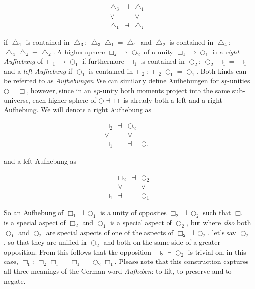 \documentclass{article}
\begin{document}
$$
  \begin{array}{ccc}
    \bigtriangleup_3 & \dashv & \bigtriangleup_4
    \\
    \vee & & \vee
    \\
    \bigtriangleup_1 & \dashv & \bigtriangleup_2
    \end{array}
  \ 
$$

if $\bigtriangleup_1$ is contained in $\bigtriangleup_3$: $\bigtriangleup_3\bigtriangleup_1=\bigtriangleup_1$
and $\bigtriangleup_2$ is contained in $\bigtriangleup_4$: $\bigtriangleup_4\bigtriangleup_2=\bigtriangleup_2$.
A higher sphere $\Box_2\rightarrow\bigcirc_2$ of a unity $\Box_1\rightarrow\bigcirc_1$ is a \emph{right
Aufhebung} of $\Box_1\rightarrow\bigcirc_1$ if furthermore $\Box_1$ is contained in $\bigcirc_2$: $\bigcirc_2\Box_1=\Box_1$
and a \emph{left Aufhebung} if $\bigcirc_1$ is contained in $\Box_2$: $\Box_2\bigcirc_1=\bigcirc_1$. Both
kinds can be referred to as \emph{Aufhebungen} We can similarly define Aufhebungen for $sp$-unities $\bigcirc\dashv\Box$,
however, since in an $sp$-unity both moments project into the same sub-universe, each higher sphere of
$\bigcirc\dashv\Box$ is already both a left and a right Aufhebung. We will denote a right Aufhebung as


$$
  \begin{array}{cccc}
    \Box_2 &\dashv& \bigcirc_2
    \\
    \vee & & \vee
    \\
    \Box_1 & & \dashv& \bigcirc_1
    \end{array}
  \ 
$$

and a left Aufhebung as

$$
  \begin{array}{cccc}
     & \Box_2 & \dashv & \bigcirc_2
    \\
     & \vee & & \vee
    \\
    \Box_1 & \dashv & & \bigcirc_1
    \end{array}
  \ 
$$

So an Aufhebung of $\Box_1\dashv\bigcirc_1$ is a unity of opposites $\Box_2\dashv\bigcirc_2$ such that
$\Box_1$ is a special aspect of $\Box_2$ and $\bigcirc_1$ is a special aspect of $\bigcirc_2$, but where
\emph{also} both $\bigcirc_1$ and $\bigcirc_2$ are special aspects of one of the aspects of $\Box_2\dashv\bigcirc_2$,
let's say $\bigcirc_2$, so that they are unified in $\bigcirc_2$ and both on the same side of a greater
opposition. From this follows that the opposition $\Box_2\dashv\bigcirc_2$ is trivial on, in this case,
$\Box_1$: $\Box_2\Box_1=\Box_1=\bigcirc_2\Box_1$. Please note that this construction captures all three meanings of the German word \emph{Aufheben}: to lift, to preserve and to negate. \\
\end{document}
